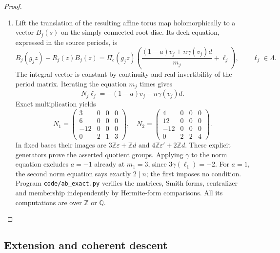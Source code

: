 \begin{proof}
\begin{enumerate}[label=\arabic*.,leftmargin=*]
\item Lift the translation of the resulting affine torus map holomorphically to a vector $B_j(s)$ on the simply connected root disc. Its deck equation, expressed in the source periods, is
\[
 B_j(g_jz)-R_j(z)B_j(z)=\Pi_c(g_jz)
 \left(\frac{(1-a)v_j+n\gamma(v_j)d}{m_j}+\ell_j\right),\qquad\ell_j\in\Lambda.
\]
The integral vector is constant by continuity and real invertibility of the period matrix. Iterating the equation $m_j$ times gives
\[
 N_j\ell_j=-(1-a)v_j-n\gamma(v_j)d.
\]
Exact multiplication yields
\[
 N_1=\begin{pmatrix}3&0&0&0\\6&0&0&0\\-12&0&0&0\\0&2&1&3\end{pmatrix},\quad
 N_2=\begin{pmatrix}4&0&0&0\\12&0&0&0\\-12&0&0&0\\0&2&2&4\end{pmatrix}.
\]
In fixed bases their images are $3\mathbb Z\varepsilon+\mathbb Zd$ and $4\mathbb Z\varepsilon'+2\mathbb Zd$. These explicit generators prove the asserted quotient groups. Applying $\gamma$ to the norm equation excludes $a=-1$ already at $m_1=3$, since $3\gamma(\ell_1)=-2$. For $a=1$, the second norm equation says exactly $2\mid n$; the first imposes no condition. Program \texttt{code/ab\_exact.py} verifies the matrices, Smith forms, centralizer and membership independently by Hermite-form comparisons. All its computations are over $\mathbb Z$ or $\mathbb Q$.
\end{enumerate}
\end{proof}

\subsection{Extension and coherent descent}\label{fam:section:A.3}

